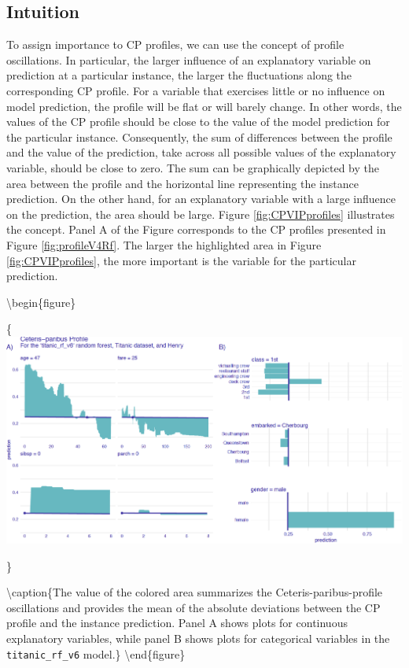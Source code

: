 \documentclass[12pt,]{krantz}
\begin{document}
\hypertarget{CPOscIntuition}{%
\subsection{Intuition}\label{CPOscIntuition}}

To assign importance to CP profiles, we can use the concept of profile oscillations. In particular, the larger influence of an explanatory variable on prediction at a particular instance, the larger the fluctuations along the corresponding CP profile. For a variable that exercises little or no influence on model prediction, the profile will be flat or will barely change. In other words, the values of the CP profile should be close to the value of the model prediction for the particular instance. Consequently, the sum of differences between the profile and the value of the prediction, take across all possible values of the explanatory variable, should be close to zero. The sum can be graphically depicted by the area between the profile and the horizontal line representing the instance prediction. On the other hand, for an explanatory variable with a large influence on the prediction, the area should be large. Figure \ref{fig:CPVIPprofiles} illustrates the concept. Panel A of the Figure corresponds to the CP profiles presented in Figure \ref{fig:profileV4Rf}. The larger the highlighted area in Figure \ref{fig:CPVIPprofiles}, the more important is the variable for the particular prediction.

\textbackslash{}begin\{figure\}

\{\centering \includegraphics[width=0.99\linewidth]{figure/profile_v4_rf2}

\}

\textbackslash{}caption\{The value of the colored area summarizes the Ceteris-paribus-profile oscillations and provides the mean of the absolute deviations between the CP profile and the instance prediction. Panel A shows plots for continuous explanatory variables, while panel B shows plots for categorical variables in the \texttt{titanic\_rf\_v6} model.\}\label{fig:CPVIPprofiles}
\textbackslash{}end\{figure\}
\end{document}

